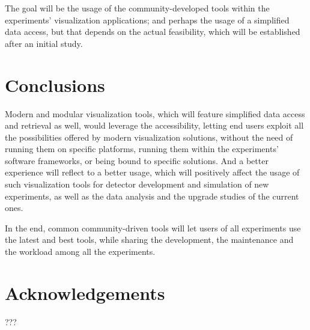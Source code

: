 \documentclass[12pt,a4paper]{article}
\begin{document}
The goal will be the usage of the community-developed tools within the experiments’ visualization applications; and
perhaps the usage of a simplified data access, but that depends on the actual feasibility, which will be established
after an initial study.

\hypertarget{conclusions}{%
\section{Conclusions}\label{conclusions}}

Modern and modular visualization tools, which will feature simplified data access and retrieval as well, would leverage
the accessibility, letting end users exploit all the possibilities offered by modern visualization solutions, without the need
of running them on specific platforms, running them within the experiments’ software frameworks, or being bound to specific solutions.
And a better experience will reflect to a better usage, which will positively affect the usage of such visualization tools for
detector development and simulation of new experiments, as well as the data analysis and the upgrade studies of the current ones.

In the end, common community-driven tools will let users of all experiments use the latest and best tools, while sharing the development,
the maintenance and the workload among all the experiments.
 
\hypertarget{acknowledgements}{%
\section{Acknowledgements}\label{acknowledgements}}


???

%
\end{document}
